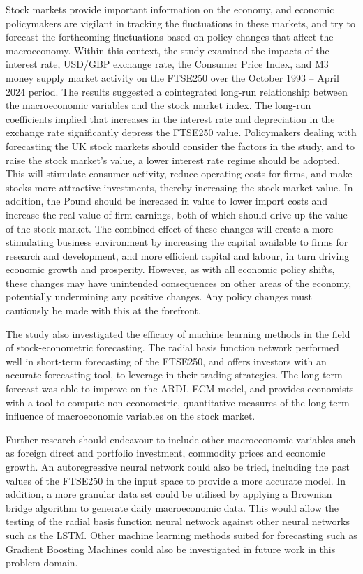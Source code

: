 \documentclass[11pt,a4paper]{article}
\begin{document}
Stock markets provide important information on the economy, 
and economic policymakers are vigilant in tracking the fluctuations 
in these markets, and try to forecast the 
forthcoming fluctuations based on policy changes that affect the macroeconomy.
Within this context, the study examined the 
impacts of the interest rate, USD/GBP
exchange rate, the Consumer Price Index, and 
M3 money supply market activity on
the FTSE250 over the October 1993 – April 2024 period.
The results suggested a cointegrated long-run
relationship between the macroeconomic variables and the stock market index. 
The long-run coefficients implied that
increases in the interest rate and depreciation in the exchange rate
significantly depress the FTSE250 value. 
Policymakers dealing with forecasting the UK stock markets
should consider the factors in the study, and to raise the stock
market's value, a lower interest rate regime should be adopted. This will 
stimulate consumer activity, reduce operating costs for firms, and make 
stocks more attractive investments, thereby increasing the stock market value. 
In addition, the Pound should be increased in value to lower import costs 
and increase the real value of firm earnings, both of which should drive up 
the value of the stock market. The combined effect of these changes will 
create a more stimulating business environment by increasing the capital 
available to firms for research and development, and more efficient 
capital and labour, in turn 
driving economic growth and prosperity. However, 
as with all economic policy shifts, these changes may have 
unintended consequences on other areas of the economy, potentially 
undermining any positive changes. Any policy changes must cautiously be made 
with this at the forefront.


The study also investigated the efficacy of machine learning methods in 
the field of stock-econometric forecasting. The radial basis function network performed well in
short-term forecasting of the FTSE250, and offers investors with an accurate forecasting tool, 
to leverage in their trading strategies. The long-term forecast was able to improve on the ARDL-ECM model, and provides 
economists with a tool to compute non-econometric, quantitative measures of the 
long-term influence of macroeconomic variables on the stock market. 

Further research should endeavour to include other macroeconomic variables such as 
foreign direct and portfolio investment, commodity prices and economic growth.
An autoregressive neural network could also be tried, including the past values of the 
FTSE250 in the input space to provide a more accurate model. In addition, 
a more granular data set could be utilised by applying a 
Brownian bridge algorithm to generate daily macroeconomic data. This would allow 
the testing of the radial basis function neural network against other neural networks 
such as the LSTM. Other machine learning methods suited for 
forecasting such as Gradient Boosting Machines could 
also be investigated in future work in this problem domain. 
\end{document}

